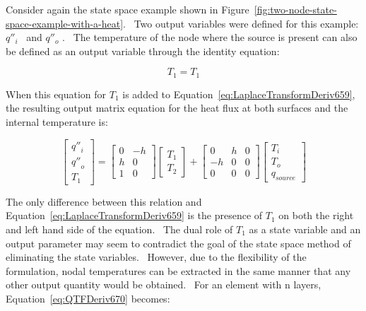 Consider again the state space example shown in Figure~\ref{fig:two-node-state-space-example-with-a-heat}.~ Two output variables were defined for this example: \({q''_i}\) ~and \({q''_o}\) .~ The temperature of the node where the source is present can also be defined as an output variable through the identity equation:

\begin{equation}
{T_1} = {T_1}
\end{equation}

When this equation for \(T_1\) is added to Equation~\ref{eq:LaplaceTransformDeriv659}, the resulting output matrix equation for the heat flux at both surfaces and the internal temperature is:

\begin{equation}
\left[ {\begin{array}{ccc}{{{q''}_i}}\\ {{{q''}_o}}\\ {{T_1}}\end{array}} \right] = \left[ {\begin{array}{ccc}0&{ - h}\\h&0\\1&0\end{array}} \right]\left[ {\begin{array}{ccc}{{T_1}}\\ {{T_2}}\end{array}} \right] + \left[ {\begin{array}{ccc}0&h&0\\ { - h}&0&0\\0&0&0\end{array}} \right]\left[ {\begin{array}{ccc}{{T_i}}\\ {{T_o}}\\ {{q_{source}}}\end{array}} \right]
\label{eq:QTFDeriv670}
\end{equation}

The only difference between this relation and Equation~\ref{eq:LaplaceTransformDeriv659} is the presence of \(T_1\) on both the right and left hand side of the equation.~ The dual role of \(T_1\) as a state variable and an output parameter may seem to contradict the goal of the state space method of eliminating the state variables.~ However, due to the flexibility of the formulation, nodal temperatures can be extracted in the same manner that any other output quantity would be obtained.~ For an element with n layers, Equation~\ref{eq:QTFDeriv670} becomes:

